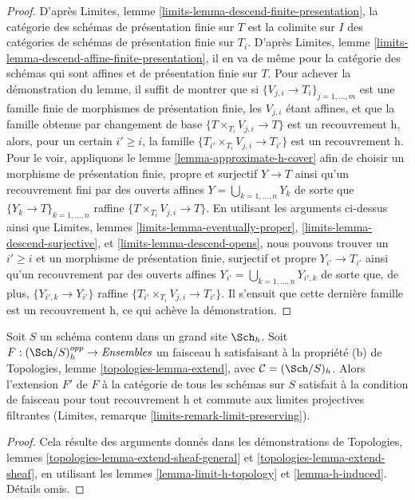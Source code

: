 \begin{proof}
D'après Limites, lemme \ref{limits-lemma-descend-finite-presentation},
la catégorie des schémas de présentation finie sur $T$ est la
colimite sur $I$ des catégories de schémas de présentation finie sur $T_i$. D'après
Limites, lemme \ref{limits-lemma-descend-affine-finite-presentation},
il en va de même pour la catégorie des schémas qui sont affines et
de présentation finie sur $T$.
Pour achever la démonstration du lemme, il suffit de montrer que si
$\{V_{j, i} \to T_i\}_{j = 1, \ldots, m}$ est une famille finie de
morphismes de présentation finie, les $V_{j, i}$ étant affines, et que la
famille obtenue par changement de base $\{T \times_{T_i} V_{j, i} \to T\}$ est
un recouvrement h, alors, pour un certain $i' \geq i$, la famille
$\{T_{i'} \times_{T_i} V_{j, i} \to T_{i'}\}$ est un recouvrement h.
Pour le voir, appliquons le lemme \ref{lemma-approximate-h-cover} afin de
choisir un morphisme de présentation finie, propre et surjectif
$Y \to T$ ainsi qu'un recouvrement fini par des ouverts affines
$Y = \bigcup_{k = 1, \ldots, n} Y_k$ de sorte que
$\{Y_k \to T\}_{k = 1, \ldots, n}$ raffine
$\{T \times_{T_i} V_{j, i} \to T\}$.
En utilisant les arguments ci-dessus ainsi que
Limites, lemmes \ref{limits-lemma-eventually-proper},
\ref{limits-lemma-descend-surjective}, et
\ref{limits-lemma-descend-opens},
nous pouvons trouver un $i' \geq i$ et un morphisme de présentation finie, surjectif et propre
$Y_{i'} \to T_{i'}$ ainsi qu'un recouvrement par des ouverts affines
$Y_{i'} = \bigcup_{k = 1, \ldots, n} Y_{i', k}$
de sorte que, de plus, $\{Y_{i', k} \to Y_{i'}\}$ raffine
$\{T_{i'} \times_{T_i} V_{j, i} \to T_{i'}\}$.
Il s'ensuit que cette dernière famille est
un recouvrement h, ce qui achève la démonstration.
\end{proof}

\begin{lemma}
\label{lemma-extend-sheaf-h}
Soit $S$ un schéma contenu dans un grand site $\Sch_h$.
Soit $F : (\Sch/S)_h^{opp} \to \textit{Ensembles}$ un faisceau h satisfaisant à
la propriété (b) de Topologies, lemme \ref{topologies-lemma-extend},
avec $\mathcal{C} = (\Sch/S)_h$.
Alors l'extension $F'$ de $F$ à la catégorie de tous les
schémas sur $S$ satisfait à la condition de faisceau pour tout recouvrement h
et commute aux limites projectives filtrantes (Limites, remarque \ref{limits-remark-limit-preserving}).
\end{lemma}

\begin{proof}
Cela résulte des arguments donnés dans les démonstrations de
Topologies, lemmes \ref{topologies-lemma-extend-sheaf-general} et
\ref{topologies-lemma-extend-sheaf}, en utilisant les
lemmes \ref{lemma-limit-h-topology} et \ref{lemma-h-induced}.
Détails omis.
\end{proof}









